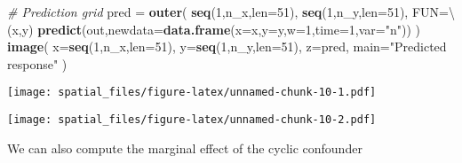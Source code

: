 \documentclass[
]{article}
\newenvironment{Shaded}{\begin{snugshade}}{\end{snugshade}}
\newcommand{\AttributeTok}[1]{\textcolor[rgb]{0.13,0.29,0.53}{#1}}
\newcommand{\CommentTok}[1]{\textcolor[rgb]{0.56,0.35,0.01}{\textit{#1}}}
\newcommand{\DecValTok}[1]{\textcolor[rgb]{0.00,0.00,0.81}{#1}}
\newcommand{\FunctionTok}[1]{\textcolor[rgb]{0.13,0.29,0.53}{\textbf{#1}}}
\newcommand{\NormalTok}[1]{#1}
\newcommand{\OtherTok}[1]{\textcolor[rgb]{0.56,0.35,0.01}{#1}}
\newcommand{\SpecialCharTok}[1]{\textcolor[rgb]{0.81,0.36,0.00}{\textbf{#1}}}
\newcommand{\StringTok}[1]{\textcolor[rgb]{0.31,0.60,0.02}{#1}}
\begin{document}
\begin{Shaded}
\begin{Highlighting}[]
\CommentTok{\# Prediction grid}
\NormalTok{pred }\OtherTok{=} \FunctionTok{outer}\NormalTok{( }\FunctionTok{seq}\NormalTok{(}\DecValTok{1}\NormalTok{,n\_x,}\AttributeTok{len=}\DecValTok{51}\NormalTok{),}
              \FunctionTok{seq}\NormalTok{(}\DecValTok{1}\NormalTok{,n\_y,}\AttributeTok{len=}\DecValTok{51}\NormalTok{),}
              \AttributeTok{FUN=}\NormalTok{\textbackslash{}(x,y) }\FunctionTok{predict}\NormalTok{(out,}\AttributeTok{newdata=}\FunctionTok{data.frame}\NormalTok{(}\AttributeTok{x=}\NormalTok{x,}\AttributeTok{y=}\NormalTok{y,}\AttributeTok{w=}\DecValTok{1}\NormalTok{,}\AttributeTok{time=}\DecValTok{1}\NormalTok{,}\AttributeTok{var=}\StringTok{"n"}\NormalTok{)) )}
\FunctionTok{image}\NormalTok{( }\AttributeTok{x=}\FunctionTok{seq}\NormalTok{(}\DecValTok{1}\NormalTok{,n\_x,}\AttributeTok{len=}\DecValTok{51}\NormalTok{), }\AttributeTok{y=}\FunctionTok{seq}\NormalTok{(}\DecValTok{1}\NormalTok{,n\_y,}\AttributeTok{len=}\DecValTok{51}\NormalTok{), }\AttributeTok{z=}\NormalTok{pred, }\AttributeTok{main=}\StringTok{"Predicted response"}\NormalTok{ )}
\end{Highlighting}
\end{Shaded}

\texttt{[image: spatial\_files/figure-latex/unnamed-chunk-10-1.pdf]}

\begin{Shaded}
\end{Shaded}

\texttt{[image: spatial\_files/figure-latex/unnamed-chunk-10-2.pdf]}

We can also compute the marginal effect of the cyclic confounder
\end{document}
